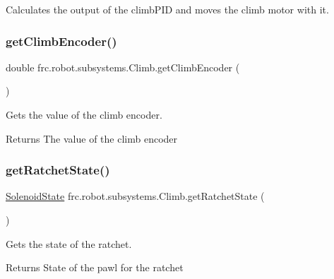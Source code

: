 Calculates the output of the climb\+P\+ID and moves the climb motor with it. 

\mbox{\label{classfrc_1_1robot_1_1subsystems_1_1_climb_a1992333ef3c8ca85baa8499ef8a19c53}} 
\subsubsection{\texorpdfstring{getClimbEncoder()}{getClimbEncoder()}}
{\footnotesize\ttfamily double frc.\+robot.\+subsystems.\+Climb.\+get\+Climb\+Encoder (\begin{DoxyParamCaption}{ }\end{DoxyParamCaption})\hspace{0.3cm}{\ttfamily [inline]}}



Gets the value of the climb encoder. 

\begin{DoxyReturn}{Returns}
The value of the climb encoder 
\end{DoxyReturn}
\mbox{\label{classfrc_1_1robot_1_1subsystems_1_1_climb_a41e5bb97ae26d2fbfdae9506fefdfc3a}} 
\subsubsection{\texorpdfstring{getRatchetState()}{getRatchetState()}}
{\footnotesize\ttfamily \mbox{\hyperlink{enumfrc_1_1robot_1_1enums_1_1_solenoid_state}{Solenoid\+State}} frc.\+robot.\+subsystems.\+Climb.\+get\+Ratchet\+State (\begin{DoxyParamCaption}{ }\end{DoxyParamCaption})\hspace{0.3cm}{\ttfamily [inline]}}



Gets the state of the ratchet. 

\begin{DoxyReturn}{Returns}
State of the pawl for the ratchet 
\end{DoxyReturn}
\mbox{\label{classfrc_1_1robot_1_1subsystems_1_1_climb_a6b0d9b0411f58d97711a9098d5d6f3c1}} 
